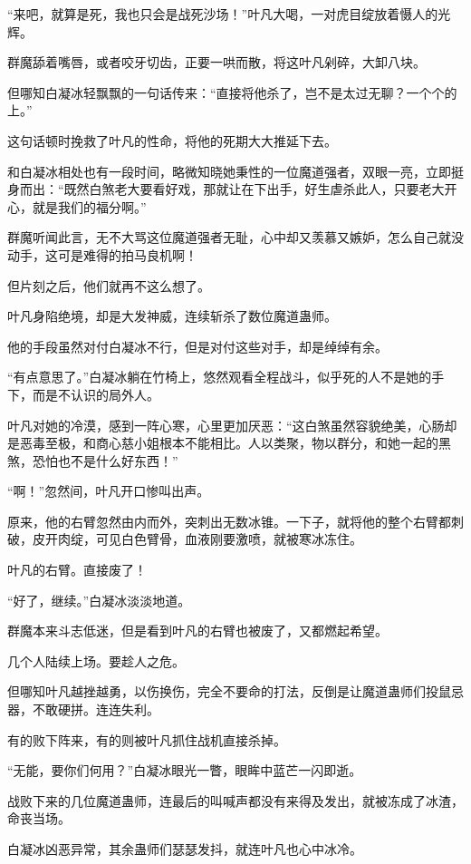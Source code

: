 
\begin{this_body}

“来吧，就算是死，我也只会是战死沙场！”叶凡大喝，一对虎目绽放着慑人的光辉。

群魔舔着嘴唇，或者咬牙切齿，正要一哄而散，将这叶凡剁碎，大卸八块。

但哪知白凝冰轻飘飘的一句话传来：“直接将他杀了，岂不是太过无聊？一个个的上。”

这句话顿时挽救了叶凡的性命，将他的死期大大推延下去。

和白凝冰相处也有一段时间，略微知晓她秉性的一位魔道强者，双眼一亮，立即挺身而出：“既然白煞老大要看好戏，那就让在下出手，好生虐杀此人，只要老大开心，就是我们的福分啊。”

群魔听闻此言，无不大骂这位魔道强者无耻，心中却又羡慕又嫉妒，怎么自己就没动手，这可是难得的拍马良机啊！

但片刻之后，他们就再不这么想了。

叶凡身陷绝境，却是大发神威，连续斩杀了数位魔道蛊师。

他的手段虽然对付白凝冰不行，但是对付这些对手，却是绰绰有余。

“有点意思了。”白凝冰躺在竹椅上，悠然观看全程战斗，似乎死的人不是她的手下，而是不认识的局外人。

叶凡对她的冷漠，感到一阵心寒，心里更加厌恶：“这白煞虽然容貌绝美，心肠却是恶毒至极，和商心慈小姐根本不能相比。人以类聚，物以群分，和她一起的黑煞，恐怕也不是什么好东西！”

“啊！”忽然间，叶凡开口惨叫出声。

原来，他的右臂忽然由内而外，突刺出无数冰锥。一下子，就将他的整个右臂都刺破，皮开肉绽，可见白色臂骨，血液刚要激喷，就被寒冰冻住。

叶凡的右臂。直接废了！

“好了，继续。”白凝冰淡淡地道。

群魔本来斗志低迷，但是看到叶凡的右臂也被废了，又都燃起希望。

几个人陆续上场。要趁人之危。

但哪知叶凡越挫越勇，以伤换伤，完全不要命的打法，反倒是让魔道蛊师们投鼠忌器，不敢硬拼。连连失利。

有的败下阵来，有的则被叶凡抓住战机直接杀掉。

“无能，要你们何用？”白凝冰眼光一瞥，眼眸中蓝芒一闪即逝。

战败下来的几位魔道蛊师，连最后的叫喊声都没有来得及发出，就被冻成了冰渣，命丧当场。

白凝冰凶恶异常，其余蛊师们瑟瑟发抖，就连叶凡也心中冰冷。


\end{this_body}
